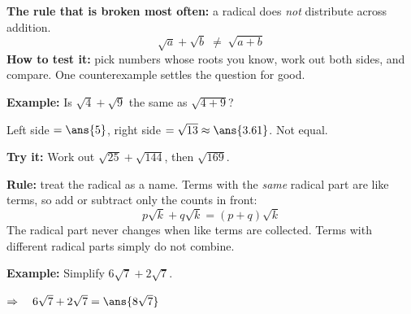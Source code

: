 \documentclass[12pt]{article}
\begin{document}


\begin{formulabox}
\textbf{The rule that is broken most often:} a radical does \emph{not} distribute across
addition.
\[ \sqrt{a} + \sqrt{b} \;\neq\; \sqrt{a + b} \]
\textbf{How to test it:} pick numbers whose roots you know, work out both sides, and
compare. One counterexample settles the question for good.
\end{formulabox}

\begin{examplebox}
\textbf{Example:} \quad Is $\sqrt{4} + \sqrt{9}$ the same as $\sqrt{4 + 9}$?

Left side $= \ans{5}$, \quad right side $= \sqrt{13} \approx \ans{3.61}$. Not equal.
\end{examplebox}

\begin{tryitbox}
\textbf{Try it:} \quad Work out $\sqrt{25} + \sqrt{144}$, then $\sqrt{169}$.\\[2pt]
\end{tryitbox}


\begin{formulabox}
\textbf{Rule:} treat the radical as a name. Terms with the \emph{same} radical part are
like terms, so add or subtract only the counts in front:
\[ p\sqrt{k} + q\sqrt{k} = (p + q)\sqrt{k} \]
The radical part never changes when like terms are collected. Terms with different
radical parts simply do not combine.
\end{formulabox}

\begin{examplebox}
\textbf{Example:} \quad Simplify $6\sqrt{7} + 2\sqrt{7}$.

$\Rightarrow\quad 6\sqrt{7} + 2\sqrt{7} = \ans{8\sqrt{7}}$
\end{examplebox}
\end{document}
